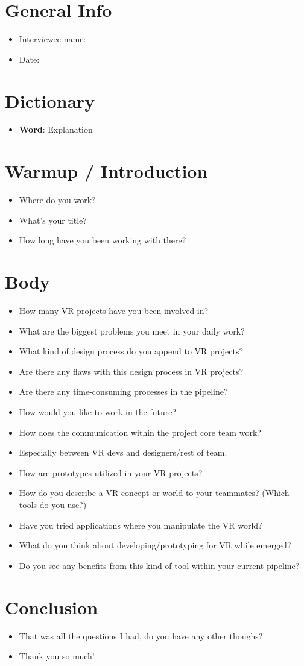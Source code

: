 \section{General Info}
{\renewcommand\labelitemi{}
\begin{itemize}
  \item Interviewee name:
  \item Date:
\end{itemize}
\section{Dictionary}
\begin{itemize}
  \item \textbf{Word}: Explanation
\end{itemize}

\section{Warmup / Introduction}
\begin{itemize}
\item
Where do you work?
\item
What's your title?
\item
How long have you been working with there?

\end{itemize}
\section{Body}
\begin{itemize}
\item
How many VR projects have you been involved in?
\item
What are the biggest problems you meet in your daily work?
\item
What kind of design process do you append to VR projects?
\item
Are there any flaws with this design process in VR projects?
\item
Are there any time-consuming processes in the pipeline?
\item
How would you like to work in the future?
\item
How does the communication within the project core team work?
\item
Especially between VR devs and designers/rest of team.
\item
How are prototypes utilized in your VR projects?
\item
How do you describe a VR concept or world to your teammates? (Which tools do you use?)
\item
Have you tried applications where you manipulate the VR world?
\item
What do you think about developing/prototyping for VR while emerged?
\item
Do you see any benefits from this kind of tool within your current pipeline?
\end{itemize}
\section{Conclusion}
\begin{itemize}
  \item
That was all the questions I had, do you have any other thoughs?
\item
Thank you so much!
\end{itemize}
}
